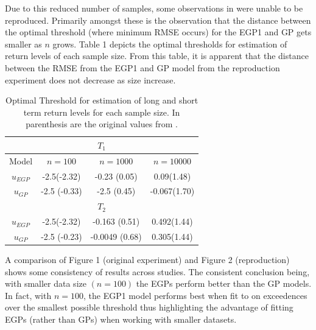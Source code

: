 \documentclass[12pt]{article}
\theoremstyle{definition}
\theoremstyle{definition}
\begin{document}
Due to this reduced number of samples, some observations in \cite{papatawn} were unable to be reproduced. Primarily amongst these is the observation that the distance between the optimal threshold (where minimum RMSE occurs) for the EGP1 and GP gets smaller as $n$ grows. Table 1 depicts the optimal thresholds for estimation of return levels of each sample size. From this table, it is apparent that the distance between the RMSE from the EGP1 and GP model from the reproduction experiment does not decrease as size increase.

\begin{table}[H]
    \centering
    \begin{tabular}{||c|c|c|c||}\hline
\multicolumn{4}{||c||}{$T_1$}\\\hline\hline
    Model& $n=100$& $n=1000$& $n=10000$\\\hline
    $u_{EGP}$ & -2.5(-2.32)& -0.23 (0.05) & 0.09(1.48)  \\
     $u_{GP}$& -2.5 (-0.33) & -2.5 (0.45) & -0.067(1.70)\\\hline\hline
     \multicolumn{4}{||c||}{$T_2$}\\\hline\hline
     $u_{EGP}$ & -2.5(-2.32)& -0.163 (0.51) & 0.492(1.44)  \\
     $u_{GP}$& -2.5 (-0.23) & -0.0049 (0.68) & 0.305(1.44)\\\hline
\end{tabular}
    \caption{Optimal Threshold for estimation of long and short term return levels for each sample size. In parenthesis are the original values from \cite{papatawn}. }
\end{table}

A comparison of Figure 1 (original experiment) and Figure 2 (reproduction) shows some consistency of results across studies. The consistent conclusion being, with smaller data size $(n=100)$ the EGPs perform better than the GP models. In fact, with $n=100$, the EGP1 model performs best when fit to on exceedences over the smallest possible threshold thus highlighting the advantage of fitting EGPs (rather than GPs) when working with smaller datasets.
\end{document}
